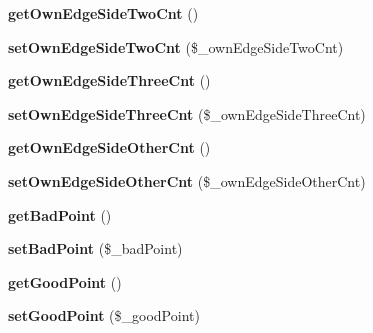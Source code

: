 \begin{DoxyCompactItemize}
\item 
{\bfseries get\+Own\+Edge\+Side\+Two\+Cnt} ()\hypertarget{class_reversi_anz_aff7eba60fd808062aaa6079750000acc}{}\label{class_reversi_anz_aff7eba60fd808062aaa6079750000acc}

\item 
{\bfseries set\+Own\+Edge\+Side\+Two\+Cnt} (\$\+\_\+own\+Edge\+Side\+Two\+Cnt)\hypertarget{class_reversi_anz_afddabe459e1b4482aadc432141ba6fe5}{}\label{class_reversi_anz_afddabe459e1b4482aadc432141ba6fe5}

\item 
{\bfseries get\+Own\+Edge\+Side\+Three\+Cnt} ()\hypertarget{class_reversi_anz_addeed894b9ab975b3d6a1ad28a1467ad}{}\label{class_reversi_anz_addeed894b9ab975b3d6a1ad28a1467ad}

\item 
{\bfseries set\+Own\+Edge\+Side\+Three\+Cnt} (\$\+\_\+own\+Edge\+Side\+Three\+Cnt)\hypertarget{class_reversi_anz_a04b6cf91352234e65db3b482b5dafcd8}{}\label{class_reversi_anz_a04b6cf91352234e65db3b482b5dafcd8}

\item 
{\bfseries get\+Own\+Edge\+Side\+Other\+Cnt} ()\hypertarget{class_reversi_anz_a2d0001fd4c483bced75b8e581cc00acf}{}\label{class_reversi_anz_a2d0001fd4c483bced75b8e581cc00acf}

\item 
{\bfseries set\+Own\+Edge\+Side\+Other\+Cnt} (\$\+\_\+own\+Edge\+Side\+Other\+Cnt)\hypertarget{class_reversi_anz_ac76d5718ad81e097eb9c273b183a1262}{}\label{class_reversi_anz_ac76d5718ad81e097eb9c273b183a1262}

\item 
{\bfseries get\+Bad\+Point} ()\hypertarget{class_reversi_anz_ab2a185790727e92d925cb3baf69c3d82}{}\label{class_reversi_anz_ab2a185790727e92d925cb3baf69c3d82}

\item 
{\bfseries set\+Bad\+Point} (\$\+\_\+bad\+Point)\hypertarget{class_reversi_anz_a2907c9b2a0659904b5d36900797ec5c0}{}\label{class_reversi_anz_a2907c9b2a0659904b5d36900797ec5c0}

\item 
{\bfseries get\+Good\+Point} ()\hypertarget{class_reversi_anz_a43bc56b57caeb7e1db0066f93e62abd6}{}\label{class_reversi_anz_a43bc56b57caeb7e1db0066f93e62abd6}

\item 
{\bfseries set\+Good\+Point} (\$\+\_\+good\+Point)\hypertarget{class_reversi_anz_acbbbe1567d8e903078b73049b40aa689}{}\label{class_reversi_anz_acbbbe1567d8e903078b73049b40aa689}


\end{DoxyCompactItemize}
